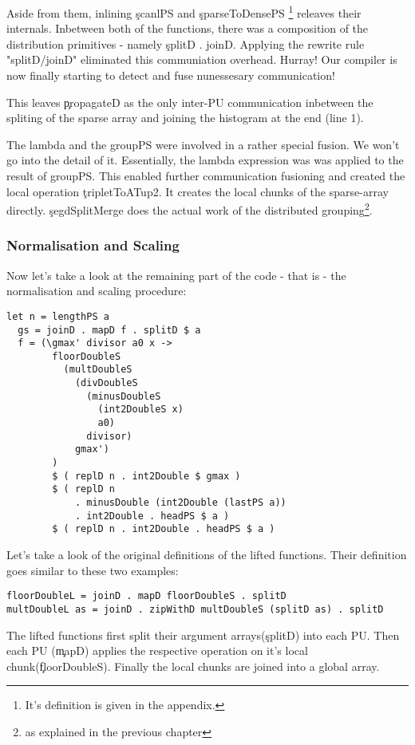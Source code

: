       
      Aside from them, inlining \c{scanlPS} and \c{sparseToDensePS}
      \footnote{It's definition is given in the appendix.} releaves their internals.
      Inbetween both of the functions, there was a composition of the distribution primitives - namely \c{splitD . joinD}.
      Applying the rewrite rule "splitD/joinD" eliminated this communiation overhead. Hurray! Our compiler
      is now finally starting to detect and fuse nunessesary communication!
      
      This leaves \c{propagateD} as the only inter-PU communication inbetween the spliting of the
      sparse array and joining the histogram at the end (line 1).
      
      The lambda and the groupPS were involved in a rather special fusion. We won't
      go into the detail of it. Essentially, the lambda expression was
      was applied to the result of groupPS. This enabled further communication
      fusioning and created the local operation \c{tripletToATup2}. It creates the
      local chunks of the sparse-array directly. \c{segdSplitMerge} does the
      actual work of the distributed grouping\footnote{as explained in the previous chapter}.
      
    \subsubsection{Normalisation and Scaling}
    
    Now let's take a look at the remaining part of the code - that is - the
    normalisation and scaling procedure:
    
    \begin{lstlisting}
let n = lengthPS a
  gs = joinD . mapD f . splitD $ a
  f = (\gmax' divisor a0 x ->
        floorDoubleS
          (multDoubleS
            (divDoubleS
              (minusDoubleS
                (int2DoubleS x)
                a0)
              divisor)
            gmax')
        )
        $ ( replD n . int2Double $ gmax )
        $ ( replD n
            . minusDouble (int2Double (lastPS a))
            . int2Double . headPS $ a )
        $ ( replD n . int2Double . headPS $ a )
    \end{lstlisting}
    Let's take a look of the original definitions of the lifted functions. Their definition goes similar to these two examples:
    \begin{lstlisting}
floorDoubleL = joinD . mapD floorDoubleS . splitD
multDoubleL as = joinD . zipWithD multDoubleS (splitD as) . splitD
    \end{lstlisting}
    The lifted functions first split their argument arrays(\c{splitD}) into each PU.
    Then each PU (\c{mapD}) applies the respective operation on it's local chunk(\c{floorDoubleS}).
    Finally the local chunks are joined into a global array.
    
